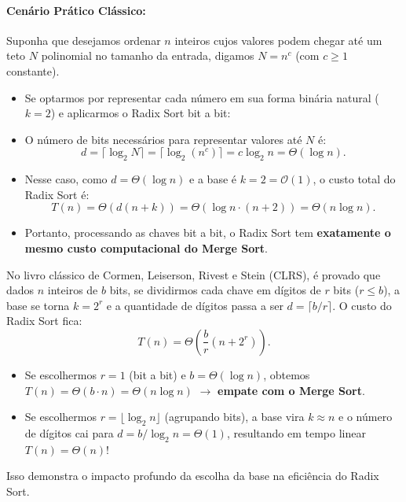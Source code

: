 \documentclass[11pt,a4paper]{article}
\begin{document}
\paragraph{Cenário Prático Clássico:}
Suponha que desejamos ordenar $n$ inteiros cujos valores podem chegar até um teto $N$ polinomial no tamanho da entrada, digamos $N = n^c$ (com $c \ge 1$ constante).
\begin{itemize}
    \item Se optarmos por representar cada número em sua forma binária natural ($k = 2$) e aplicarmos o Radix Sort bit a bit:
    \item O número de bits necessários para representar valores até $N$ é:
    \[
        d = \lceil \log_2 N \rceil = \lceil \log_2(n^c) \rceil = c \log_2 n = \Theta(\log n).
    \]
    \item Nesse caso, como $d = \Theta(\log n)$ e a base é $k = 2 = \mathcal{O}(1)$, o custo total do Radix Sort é:
    \[
        T(n) = \Theta(d(n + k)) = \Theta(\log n \cdot (n + 2)) = \Theta(n \log n).
    \]
    \item Portanto, processando as chaves bit a bit, o Radix Sort tem \textbf{exatamente o mesmo custo computacional do Merge Sort}.
\end{itemize}

\begin{teoria}
No livro clássico de Cormen, Leiserson, Rivest e Stein (CLRS), é provado que dados $n$ inteiros de $b$ bits, se dividirmos cada chave em dígitos de $r$ bits ($r \le b$), a base se torna $k = 2^r$ e a quantidade de dígitos passa a ser $d = \lceil b/r \rceil$. O custo do Radix Sort fica:
\[
    T(n) = \Theta\left(\frac{b}{r}(n + 2^r)\right).
\]
\begin{itemize}
    \item Se escolhermos $r = 1$ (bit a bit) e $b = \Theta(\log n)$, obtemos $T(n) = \Theta(b \cdot n) = \Theta(n \log n)$ $\rightarrow$ \textbf{empate com o Merge Sort}.
    \item Se escolhermos $r = \lfloor \log_2 n \rfloor$ (agrupando bits), a base vira $k \approx n$ e o número de dígitos cai para $d = b / \log_2 n = \Theta(1)$, resultando em tempo linear $T(n) = \Theta(n)$!
\end{itemize}
Isso demonstra o impacto profundo da escolha da base na eficiência do Radix Sort.
\end{teoria}
\end{document}
